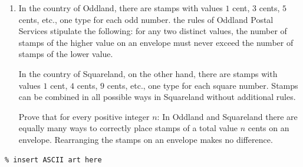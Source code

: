 \documentclass{article}
\begin{document}
\begin{enumerate}[1.]
\vfill

\item %
In the country of Oddland, there are stamps with values $1$ cent, $3$ cents, $5$ cents, etc., one type for each odd number.
the rules of Oddland Postal Services stipulate the following: for any two distinct values, the number of stamps of the higher value on an envelope must never exceed the number of stamps of the lower value.

In the country of Squareland, on the other hand, there are stamps with values $1$ cent, $4$ cents, $9$ cents, etc., one type for each square number.
Stamps can be combined in all possible ways in Squareland without additional rules.

Prove that for every positive integer $n$:
In Oddland and Squareland there are equally many ways to correctly place stamps of a total value $n$ cents on an envelope.
Rearranging the stamps on an envelope makes no difference.


\end{enumerate}


\vfill
\vfill

\begin{center}
\begin{BVerbatim}
% insert ASCII art here
\end{BVerbatim}
\end{center}
\end{document}
